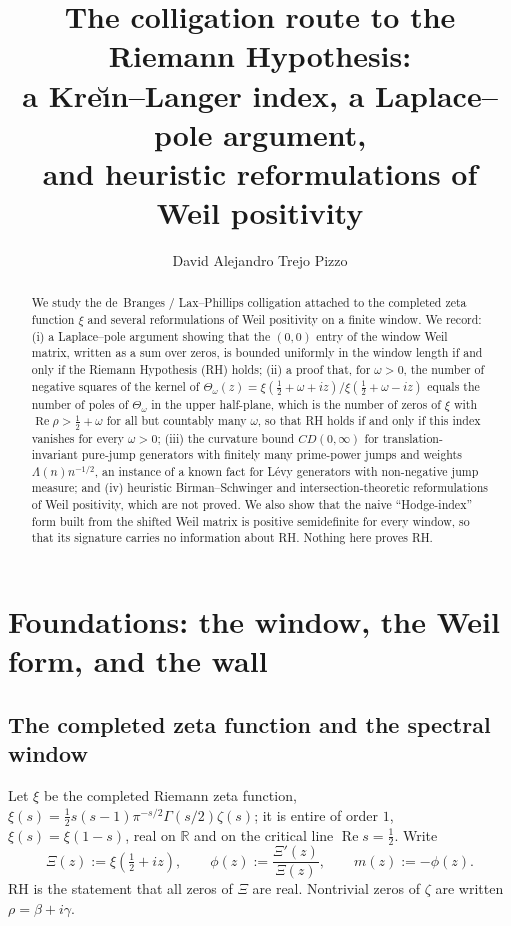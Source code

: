 \documentclass[11pt]{amsart}
\title[The colligation route]{The colligation route to the Riemann Hypothesis:\\
a Kre\u\i n--Langer index, a Laplace--pole argument,\\
and heuristic reformulations of Weil positivity}
\author{David Alejandro Trejo Pizzo}
\theoremstyle{definition}
\theoremstyle{remark}
\renewcommand{\Re}{\operatorname{Re}}
\newcommand{\half}{\tfrac{1}{2}}
\newcommand{\om}{\omega}
\newcommand{\gam}{\gamma}
\newcommand{\Lam}{\Lambda}
\newcommand{\R}{\mathbb{R}}
\newcommand{\Xibar}{\Xi}
\newcommand{\Th}{\Theta}
\begin{document}
\begin{abstract}
We study the de~Branges / Lax--Phillips colligation attached to the completed zeta function $\xi$
and several reformulations of Weil positivity on a finite window. We record:
(i) a Laplace--pole argument showing that the $(0,0)$ entry of the window Weil matrix, written as
a sum over zeros, is bounded uniformly in the window length if and only if the Riemann
Hypothesis (RH) holds;
(ii) a proof that, for $\om>0$, the number of negative squares of the kernel of
$\Th_\om(z)=\xi(\half+\om+iz)/\xi(\half+\om-iz)$ equals the number of poles of $\Th_\om$ in the
upper half-plane, which is the number of zeros of $\xi$ with $\Re\rho>\half+\om$ for all but
countably many $\om$, so that RH holds if and only if this index vanishes for every $\om>0$;
(iii) the curvature bound $CD(0,\infty)$ for translation-invariant pure-jump generators with
finitely many prime-power jumps and weights $\Lam(n)n^{-1/2}$, an instance of a known fact for
L\'evy generators with non-negative jump measure; and (iv) heuristic Birman--Schwinger and
intersection-theoretic reformulations of Weil positivity, which are not proved. We also show that
the naive ``Hodge-index'' form built from the shifted Weil matrix is positive semidefinite for every
window, so that its signature carries no information about RH. Nothing here proves RH.
\end{abstract}

\maketitle

\tableofcontents

\section{Foundations: the window, the Weil form, and the wall}

\subsection{The completed zeta function and the spectral window}
Let $\xi$ be the completed Riemann zeta function,
$\xi(s)=\half s(s-1)\pi^{-s/2}\Gamma(s/2)\zeta(s)$; it is entire of order $1$, $\xi(s)=\xi(1-s)$, real on $\R$ and on the critical line $\Re s=\half$.
Write
\[
   \Xibar(z):=\xi(\half+iz),\qquad \phi(z):=\frac{\Xibar'(z)}{\Xibar(z)},\qquad
   m(z):=-\phi(z).
\]
RH is the statement that all zeros of $\Xibar$ are real. Nontrivial zeros of $\zeta$ are written
$\rho=\beta+i\gam$.
\end{document}
